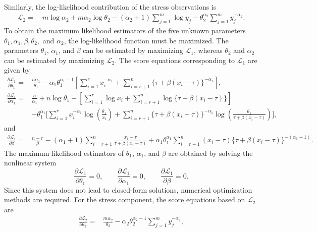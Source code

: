 \documentclass[twoside]{article}
\begin{document}
Similarly, the log-likelihood contribution of the stress observations is
\begin{align}
	\mathcal{L}_2
	=&\ m\log\alpha_2+m\alpha_2\log\theta_2
	-(\alpha_2+1)\sum_{j=1}^{m}\log y_j
	-\theta_2^{\alpha_2}\sum_{j=1}^{m}y_j^{-\alpha_2}.
	\label{eq:L2_iw}
\end{align}
To obtain the maximum likelihood estimators of the five unknown parameters
$\theta_1,\alpha_1,\beta,\theta_2,$ and $\alpha_2$, the log-likelihood function must be maximized. The parameters $\theta_1$, $\alpha_1$, and $\beta$ can be estimated by maximizing $\mathcal{L}_1$, whereas $\theta_2$ and $\alpha_2$ can be estimated by maximizing $\mathcal{L}_2$. The score equations corresponding to $\mathcal{L}_1$ are given by
\begin{align}
	\frac{\partial \mathcal{L}_1}{\partial \theta_1}
	=&\frac{n\alpha_1}{\theta_1}
	-\alpha_1\theta_1^{\alpha_1-1}
	\left[
	\sum_{i=1}^{r}x_i^{-\alpha_1}
	+
	\sum_{i=r+1}^{n}
	\{\tau+\beta(x_i-\tau)\}^{-\alpha_1}
	\right],
	\label{eq:score_theta1_iw}\\
	\frac{\partial \mathcal{L}_1}{\partial \alpha_1}
	=&\frac{n}{\alpha_1}+n\log\theta_1
	-\left[
	\sum_{i=1}^{r}\log x_i+
	\sum_{i=r+1}^{n}\log\{\tau+\beta(x_i-\tau)\}
	\right] \nonumber\\
	&-\theta_1^{\alpha_1}
	\Bigg[
	\sum_{i=1}^{r}x_i^{-\alpha_1}
	\log\left(\frac{\theta_1}{x_i}\right)
	+
	\sum_{i=r+1}^{n}
	\{\tau+\beta(x_i-\tau)\}^{-\alpha_1}
	\log\left(\frac{\theta_1}{\tau+\beta(x_i-\tau)}\right)
	\Bigg],
	\label{eq:score_alpha1_iw}
\end{align}
and
\begin{align}
	\frac{\partial \mathcal{L}_1}{\partial \beta}
	=&\frac{n-r}{\beta}
	-(\alpha_1+1)
	\sum_{i=r+1}^{n}
	\frac{x_i-\tau}{\tau+\beta(x_i-\tau)}+\alpha_1\theta_1^{\alpha_1}
	\sum_{i=r+1}^{n}
	(x_i-\tau)\{\tau+\beta(x_i-\tau)\}^{-(\alpha_1+1)}.
	\label{eq:score_beta_iw}
\end{align}
The maximum likelihood estimators of $\theta_1$, $\alpha_1$, and $\beta$ are obtained by solving the nonlinear system
\[
\frac{\partial \mathcal{L}_1}{\partial \theta_1}=0,\qquad
\frac{\partial \mathcal{L}_1}{\partial \alpha_1}=0,\qquad
\frac{\partial \mathcal{L}_1}{\partial \beta}=0.
\]
Since this system does not lead to closed-form solutions, numerical optimization methods are required. For the stress component, the score equations based on $\mathcal{L}_2$ are
\begin{align}
	\frac{\partial \mathcal{L}_2}{\partial \theta_2}
	=&\frac{m\alpha_2}{\theta_2}
	-\alpha_2\theta_2^{\alpha_2-1}
	\sum_{j=1}^{m}y_j^{-\alpha_2},
	\label{eq:score_theta2_iw}
\end{align}
\end{document}
